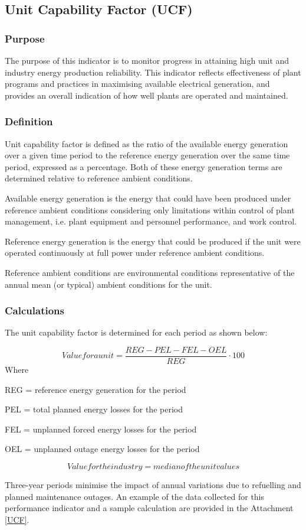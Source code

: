 \subsection{Unit Capability Factor (UCF)}
\subsubsection{Purpose}
The purpose of this indicator is to monitor progress in attaining high
unit and industry energy production reliability. This indicator
reflects effectiveness of plant programs and practices in maximising
available electrical generation, and provides an overall indication of
how well plants are operated and maintained.

\subsubsection{Definition}
Unit capability factor is defined as the ratio of the available energy
generation over a given time period to the reference energy generation
over the same time period, expressed as a percentage. Both of these
energy generation terms are determined relative to reference ambient
conditions.

Available energy generation is the energy that could have been
produced under reference ambient conditions considering only
limitations within control of plant management, i.e. plant equipment
and personnel performance, and work control.

Reference energy generation is the energy that could be produced if
the unit were operated continuously at full power under reference
ambient conditions.

Reference ambient conditions are environmental conditions
representative of the annual mean (or typical) ambient conditions for
the unit.

\subsubsection{Calculations}

The unit capability factor is determined for each period as shown
below:

$$ Value for a unit = \frac{REG-PEL-FEL-OEL}{REG}\cdot 100 $$
Where

REG  =	reference energy generation for the period

PEL   =	total planned energy losses for the period

FEL   =	unplanned forced energy losses for the period

OEL  =	unplanned outage energy losses for the period

$$Value for the industry = median of the unit values$$

Three-year periods minimise the impact of annual variations due to refuelling and planned maintenance outages. An example of the data collected for this performance indicator and a sample calculation are provided in the Attachment \ref{UCF}.

